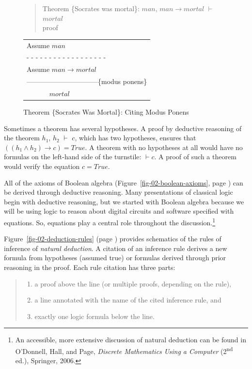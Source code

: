 \begin{figure}
\begin{quote}
Theorem \{Socrates was mortal\}: $man$, $man \rightarrow mortal$ $\vdash$ $mortal$ \\
proof
\end{quote}
\begin{center}
\begin{tabular}{l}
Assume $man$                    \\
 - - - - - - - - - - - - - - - - - -\\
Assume $man \rightarrow mortal$ \\
--------------------------------\{modus ponens\} \\
~~~~~~ $mortal$                 \\
\end{tabular}
\end{center}
\caption{Theorem \{Socrates Was Mortal\}: Citing Modus Ponens}
\label{fig:socrates-proof}
\end{figure}

Sometimes a theorem has several hypotheses.
A proof by deductive reasoning of the theorem
$h_1$, $h_2$ $\vdash$ $c$,
which has two hypotheses,
ensures that
$((h_1 \wedge h_2) \rightarrow c) = True$.
A theorem with no hypotheses at all
would have no formulas on the left-hand side of the turnstile:
$\vdash c$.
A proof of such a theorem would
verify the equation $c = True$.

All of the axioms of Boolean algebra
(Figure~\ref{fig-02-boolean-axioms}, page \pageref{fig-02-boolean-axioms})
can be derived through deductive reasoning.
Many presentations of classical logic begin with
deductive reasoning,
but we started with Boolean algebra
because we will be using logic to reason about
digital circuits and software specified with equations.
So, equations play a central role throughout the
discussion.\footnote{An accessible,
more extensive discussion of natural deduction can be found
in O'Donnell, Hall, and Page,
\emph{Discrete Mathematics Using a Computer}
(2\textsuperscript{nd} ed.), Springer, 2006.}

Figure~\ref{fig-02-deduction-rules} (page \pageref{fig-02-deduction-rules})
provides schematics of the rules of inference of \emph{natural deduction}.
A citation of an inference rule derives a new formula
from hypotheses (assumed true) or formulas derived through prior reasoning in the proof.
Each rule citation
has three parts:
\begin{quote}
\begin{enumerate}
\item a proof above the line (or multiple proofs, depending on the rule),
\item a line annotated with the name of the cited inference rule, and
\item exactly one logic formula below the line.
\end{enumerate}
\end{quote}

